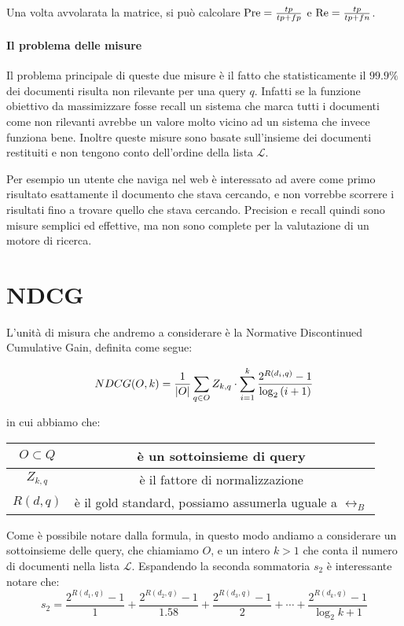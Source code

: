 Una volta avvolarata la matrice, si può calcolare $\text{Pre} = \frac{tp}{tp + fp}$ e $\text{Re} = \frac{tp}{tp + fn}$.

\paragraph{Il problema delle misure}
Il problema principale di queste due misure è il fatto che statisticamente il $99.9\%$ dei documenti
risulta non rilevante per una query $q$. 
Infatti se la funzione obiettivo da massimizzare fosse recall
un sistema che marca tutti i documenti come non rilevanti avrebbe
un valore molto vicino ad un sistema che invece funziona bene. Inoltre
queste misure sono basate sull'insieme dei documenti restituiti e non tengono
conto dell'ordine della lista $\mathcal{L}$.

Per esempio un utente che naviga nel web è interessato
ad avere come primo risultato esattamente il documento che stava cercando,
e non vorrebbe scorrere i risultati fino a trovare quello che stava cercando.
Precision e recall quindi sono misure semplici ed effettive, ma non sono
complete per la valutazione di un motore di ricerca.

\section{NDCG}
L'unità di misura che andremo a considerare è la Normative Discontinued Cumulative Gain,
definita come segue:

$$
NDCG(O, k) = \frac{1}{\left|O\right|} \sum_{q \in O} Z_{k, q} \cdot \sum_{i=1}^{k} \frac{2^{R(d_i, q)} - 1}{\log_2{(i + 1)}} \\
$$

in cui abbiamo che:
\begin{table}[h!]
	\centering
\begin{tabular}{|c|c|}
	\hline
	$ O \subset Q$ & è un sottoinsieme di query \\
	\hline
	$Z_{k,q}$ & è il fattore di normalizzazione \\
	\hline
	$R(d,q)$ & è il gold standard, possiamo assumerla uguale a $\rel_B$ \\
	\hline
\end{tabular}
\end{table}


Come è possibile notare dalla formula, in questo modo andiamo a considerare un sottoinsieme delle query, che chiamiamo $O$,
e un intero $k>1$ che conta il numero di documenti nella lista $\mathcal{L}$.
Espandendo la seconda sommatoria $s_2$ è interessante notare che:
$$
s_2 = \frac{2^{R(d_1, q) } - 1}{1} + \frac{2^{R(d_2, q)} - 1}{1.58} + \frac{2^{R(d_3, q)} - 1}{2} + \dotsb + \frac{2^{R(d_k, q) } - 1}{\log_2{k + 1}}
$$

